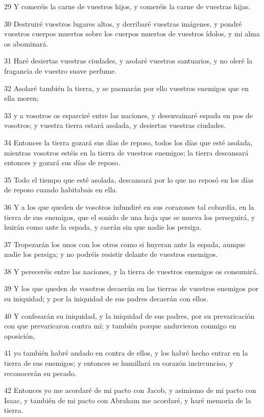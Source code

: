 \par 29 Y comeréis la carne de vuestros hijos, y comeréis la carne de vuestras hijas.
\par 30 Destruiré vuestros lugares altos, y derribaré vuestras imágenes, y pondré vuestros cuerpos muertos sobre los cuerpos muertos de vuestros ídolos, y mi alma os abominará.
\par 31 Haré desiertas vuestras ciudades, y asolaré vuestros santuarios, y no oleré la fragancia de vuestro suave perfume.
\par 32 Asolaré también la tierra, y se pasmarán por ello vuestros enemigos que en ella moren;
\par 33 y a vosotros os esparciré entre las naciones, y desenvainaré espada en pos de vosotros; y vuestra tierra estará asolada, y desiertas vuestras ciudades.
\par 34 Entonces la tierra gozará sus días de reposo, todos los días que esté asolada, mientras vosotros estéis en la tierra de vuestros enemigos; la tierra descansará entonces y gozará sus días de reposo.
\par 35 Todo el tiempo que esté asolada, descansará por lo que no reposó en los días de reposo cuando habitabais en ella.
\par 36 Y a los que queden de vosotros infundiré en sus corazones tal cobardía, en la tierra de sus enemigos, que el sonido de una hoja que se mueva los perseguirá, y huirán como ante la espada, y caerán sin que nadie los persiga.
\par 37 Tropezarán los unos con los otros como si huyeran ante la espada, aunque nadie los persiga; y no podréis resistir delante de vuestros enemigos.
\par 38 Y pereceréis entre las naciones, y la tierra de vuestros enemigos os consumirá.
\par 39 Y los que queden de vosotros decaerán en las tierras de vuestros enemigos por su iniquidad; y por la iniquidad de sus padres decaerán con ellos.
\par 40 Y confesarán su iniquidad, y la iniquidad de sus padres, por su prevaricación con que prevaricaron contra mí; y también porque anduvieron conmigo en oposición,
\par 41 yo también habré andado en contra de ellos, y los habré hecho entrar en la tierra de sus enemigos; y entonces se humillará su corazón incircunciso, y reconocerán su pecado.
\par 42 Entonces yo me acordaré de mi pacto con Jacob, y asimismo de mi pacto con Isaac, y también de mi pacto con Abraham me acordaré, y haré memoria de la tierra.
